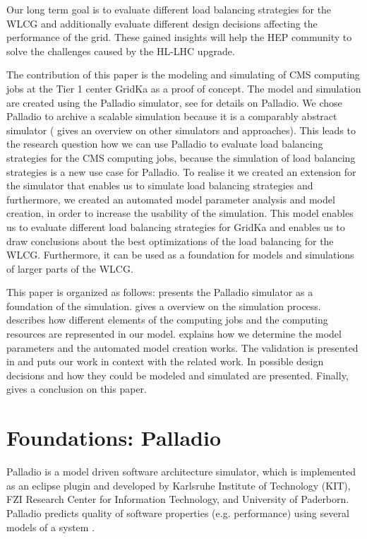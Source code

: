\documentclass[a4paper]{jpconf}
\begin{document}
Our long term goal is to evaluate different load balancing strategies for the WLCG and additionally evaluate different design decisions affecting the performance of the grid. These gained insights will help the HEP community to solve the challenges caused by the HL-LHC upgrade.

The contribution of this paper is the modeling and simulating of CMS computing jobs at the Tier 1 center GridKa as a proof of concept.
The model and simulation are created using the Palladio simulator, see  for details on Palladio. We chose Palladio to archive a scalable simulation because it is a comparably abstract simulator ( gives an overview on other simulators and approaches).
This leads to the research question how we can use Palladio to evaluate load balancing strategies for the CMS computing jobs, because the simulation of load balancing strategies is a new use case for Palladio. To realise it we created an extension for the simulator that enables us to simulate load balancing strategies and furthermore, we created an automated model parameter analysis and model creation, in order to increase the usability of the simulation.
This model enables us to evaluate different load balancing strategies for GridKa and enables us to draw conclusions about the best optimizations of the load balancing for the WLCG. Furthermore, it can be used as a foundation for models and simulations of larger parts of the WLCG.


This paper is organized as follows:  presents the Palladio simulator as a foundation of the simulation.  gives a overview on the simulation process.  describes how different elements of the computing jobs and the computing resources are represented in our model.  explains how we determine the model parameters and the automated model creation works. The validation is presented in  and  puts our work in context with the related work. In  possible design decisions and how they could be modeled and simulated are presented. Finally,  gives a conclusion on this paper.


\section{Foundations: Palladio}
\label{sec:palladio}
Palladio is a model driven software architecture simulator, which is implemented as an eclipse plugin and developed by Karlsruhe Institute of Technology (KIT), FZI Research Center for Information Technology, and University of Paderborn. Palladio predicts quality of software properties (e.g. performance) using several models of a system \cite{BECKER20093}.
\end{document}
